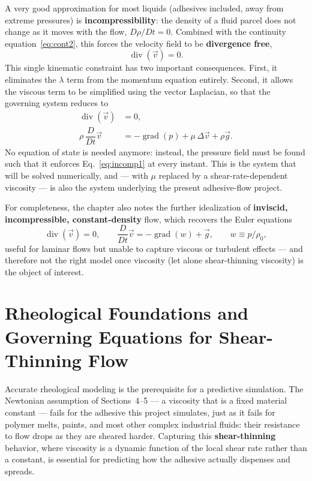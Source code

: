 \documentclass[11pt]{article}
\newcommand{\vv}{\vec{v}}
\newcommand{\vg}{\vec{g}}
\newcommand{\DDt}{\dfrac{D}{Dt}}
\begin{document}
A very good approximation for most liquids (adhesives included, away from extreme pressures) is \textbf{incompressibility}: the density of a fluid parcel does not change as it moves with the flow, $D\rho/Dt = 0$. Combined with the continuity equation~\eqref{eq:cont2}, this forces the velocity field to be \textbf{divergence free},
\begin{equation}
  \operatorname{div}(\vv) = 0.
  \label{eq:divfree}
\end{equation}
This single kinematic constraint has two important consequences. First, it eliminates the $\lambda$ term from the momentum equation entirely. Second, it allows the viscous term to be simplified using the vector Laplacian, so that the governing system reduces to
\begin{align}
  \operatorname{div}(\vv) &= 0, \label{eq:incomp1}\\
  \rho\,\DDt\vv &= -\operatorname{grad}(p) + \mu\,\Delta\vv + \rho\vg. \label{eq:incomp2}
\end{align}
No equation of state is needed anymore: instead, the pressure field must be found such that it enforces Eq.~\eqref{eq:incomp1} at every instant. This is the system that will be solved numerically, and — with $\mu$ replaced by a shear-rate-dependent viscosity — is also the system underlying the present adhesive-flow project.

For completeness, the chapter also notes the further idealization of \textbf{inviscid, incompressible, constant-density} flow, which recovers the Euler equations
\begin{equation}
  \operatorname{div}(\vv) = 0, \qquad \DDt\vv = -\operatorname{grad}(w) + \vg, \qquad w \equiv p/\rho_0,
\end{equation}
useful for laminar flows but unable to capture viscous or turbulent effects — and therefore not the right model once viscosity (let alone shear-thinning viscosity) is the object of interest.

\section{Rheological Foundations and Governing Equations for Shear-Thinning Flow}
\label{sec:shear-thinning}

Accurate rheological modeling is the prerequisite for a predictive simulation. The Newtonian assumption of Sections~4--5 — a viscosity that is a fixed material constant — fails for the adhesive this project simulates, just as it fails for polymer melts, paints, and most other complex industrial fluids: their resistance to flow drops as they are sheared harder. Capturing this \textbf{shear-thinning} behavior, where viscosity is a dynamic function of the local shear rate rather than a constant, is essential for predicting how the adhesive actually dispenses and spreads.
\end{document}
